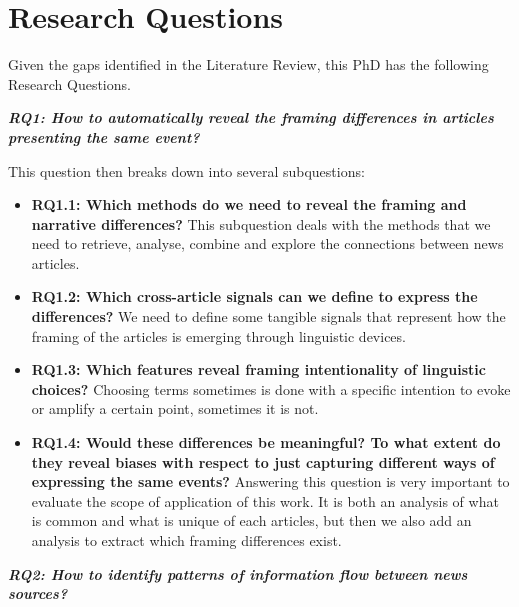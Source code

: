 \chapter{Research Questions}
\label{chap:research_questions}


Given the gaps identified in the Literature Review, this PhD has the following Research Questions.

\vspace{12px}

\textit{\textbf{RQ1: How to automatically reveal the framing differences in articles presenting the same event?}}

\vspace{12px}

This question then breaks down into several subquestions:

\begin{itemize}
    \item \textbf{RQ1.1: Which methods do we need to reveal the framing and narrative differences?} This subquestion deals with the methods that we need to retrieve, analyse, combine and explore the connections between news articles.
    \item \textbf{RQ1.2: Which cross-article signals can we define to express the differences?} We need to define some tangible signals that represent how the framing of the articles is emerging through linguistic devices.
    \item \textbf{RQ1.3: Which features reveal framing intentionality of linguistic choices?} Choosing terms sometimes is done with a specific intention to evoke or amplify a certain point, sometimes it is not.
    \item \textbf{RQ1.4: Would these differences be meaningful? To what extent do they reveal biases with respect to just capturing different ways of expressing the same events?} Answering this question is very important to evaluate the scope of application of this work. It is both an analysis of what is common and what is unique of each articles, but then we also add an analysis to extract which framing differences exist.   
\end{itemize}


\vspace{12px}

\textit{\textbf{RQ2: How to identify patterns of information flow between news sources?}}


